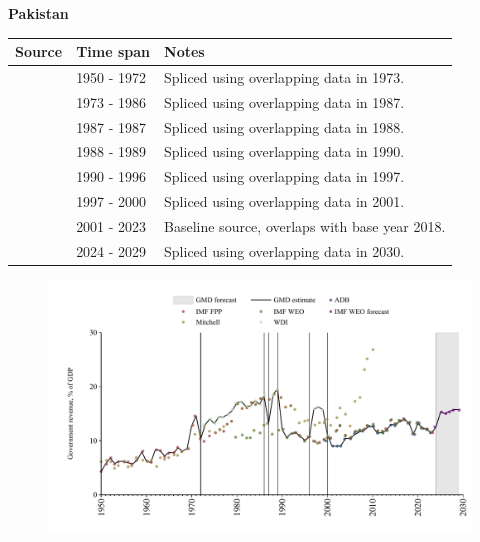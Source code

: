 \documentclass[12pt,a4paper,landscape]{article}
\begin{document}
\begin{adjustbox}{max totalsize={\paperwidth}{\paperheight},center}
\begin{minipage}[t][\textheight][t]{\textwidth}
\vspace*{0.5cm}
{}
\begin{center}
{\Large\bfseries Pakistan}
\end{center}
\vspace{0.5cm}
\begin{table}[H]
\centering
\small
\begin{tabular}{|l|l|l|}
\hline
\textbf{Source} & \textbf{Time span} & \textbf{Notes} \\
\hline
\rowcolor{white}\cite{IMF_FPP}& 1950 - 1972 &Spliced using overlapping data in 1973.\\
\rowcolor{lightgray}\cite{WDI}& 1973 - 1986 &Spliced using overlapping data in 1987.\\
\rowcolor{white}\cite{IMF_WEO}& 1987 - 1987 &Spliced using overlapping data in 1988.\\
\rowcolor{lightgray}\cite{WDI}& 1988 - 1989 &Spliced using overlapping data in 1990.\\
\rowcolor{white}\cite{IMF_WEO}& 1990 - 1996 &Spliced using overlapping data in 1997.\\
\rowcolor{lightgray}\cite{WDI}& 1997 - 2000 &Spliced using overlapping data in 2001.\\
\rowcolor{white}\cite{ADB}& 2001 - 2023 &Baseline source, overlaps with base year 2018.\\
\rowcolor{lightgray}\cite{IMF_WEO_forecast}& 2024 - 2029 &Spliced using overlapping data in 2030.\\
\hline
\end{tabular}
\end{table}
\begin{figure}[H]
\centering
\includegraphics[width=\textwidth,height=0.6\textheight,keepaspectratio]{graphs/PAK_govrev_GDP.pdf}
\end{figure}
\end{minipage}
\end{adjustbox}
\end{document}

